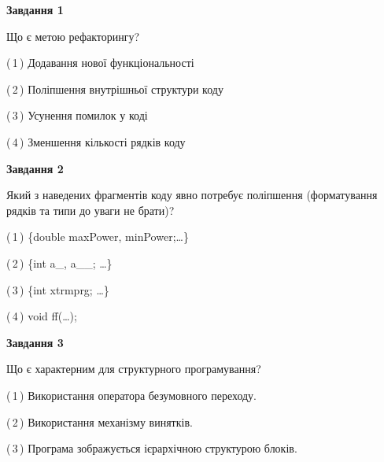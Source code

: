 \documentclass[10pt, ukrainian]{article}
\begin{document}
{
\begin {large}
{\begin {center}\textbf{Завдання 1}\end {center}}\par
Що є метою рефакторингу?\par
\vspace{2mm}



(\,1\,) Додавання нової функціональності%



(\,2\,) Поліпшення внутрішньої структури коду%



(\,3\,) Усунення помилок у коді%



(\,4\,) Зменшення кількості рядків коду%


{\begin {center}\textbf{Завдання 2}\end {center}}\par
Який з наведених фрагментів коду явно потребує поліпшення (форматування рядків та типи до уваги не брати)?\par
\vspace{2mm}



(\,1\,) \{double maxPower, minPower;…\} %



(\,2\,) \{int a\_, a\_\_; …\}%



(\,3\,) \{int xtrmprg; …\}%



(\,4\,) void ff(…);%


{\begin {center}\textbf{Завдання 3}\end {center}}\par
Що є характерним для структурного програмування?\par
\vspace{2mm}



(\,1\,) Використання оператора безумовного переходу. %



(\,2\,) Використання механізму винятків. %



(\,3\,) Програма зображується ієрархічною структурою блоків.%




\end{large}}
\end{document}
